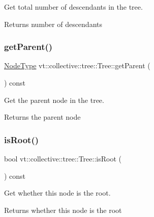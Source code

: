 Get total number of descendants in the tree. 

\begin{DoxyReturn}{Returns}
number of descendants 
\end{DoxyReturn}
\mbox{\label{structvt_1_1collective_1_1tree_1_1_tree_ab509dada696b718152e8ac04edd551af}} 
\subsubsection{\texorpdfstring{get\+Parent()}{getParent()}}
{\footnotesize\ttfamily \hyperlink{namespacevt_a866da9d0efc19c0a1ce79e9e492f47e2}{Node\+Type} vt\+::collective\+::tree\+::\+Tree\+::get\+Parent (\begin{DoxyParamCaption}{ }\end{DoxyParamCaption}) const}



Get the parent node in the tree. 

\begin{DoxyReturn}{Returns}
the parent node 
\end{DoxyReturn}
\mbox{\label{structvt_1_1collective_1_1tree_1_1_tree_a88b2add909b0035f4844317481ed559b}} 
\subsubsection{\texorpdfstring{is\+Root()}{isRoot()}}
{\footnotesize\ttfamily bool vt\+::collective\+::tree\+::\+Tree\+::is\+Root (\begin{DoxyParamCaption}{ }\end{DoxyParamCaption}) const}



Get whether this node is the root. 

\begin{DoxyReturn}{Returns}
whether this node is the root 
\end{DoxyReturn}
\mbox{\label{structvt_1_1collective_1_1tree_1_1_tree_a56532f6b47b9c71864980b73deee2d5a}} 
